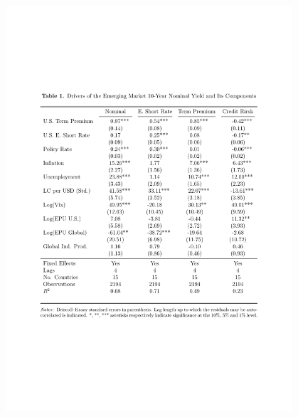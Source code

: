 \documentclass[12pt, aspectratio=169, xcolor=dvipsnames]{beamer}
\begin{document}
\begin{frame}
\vspace{-0.8cm}
\begin{figure}[!htbp]
\begin{center} %
\includegraphics[trim={2cm 7.2cm 2cm 4cm},clip, width=0.95\textwidth,height=1.15\textheight]{../Tables/ycdcmp10y.pdf}
\par\end{center}
\end{figure}
\end{frame}
\end{document}
